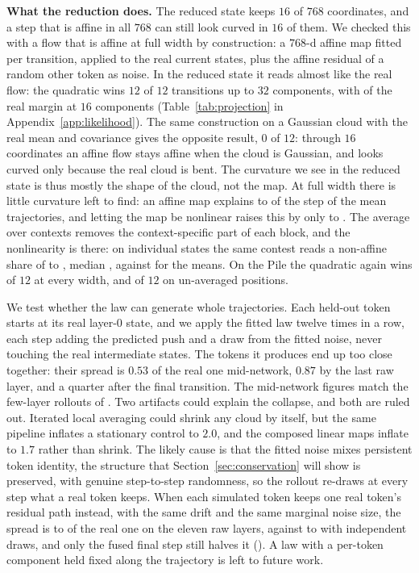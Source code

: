 \documentclass[mlmain]{jmlr}
\begin{document}
\textbf{What the reduction does.} The reduced state keeps $16$ of
$768$ coordinates, and a step that is affine in all $768$ can still look
curved in $16$ of them. We checked this with a flow that is affine at
full width by construction: a $768$-d affine map fitted per transition,
applied to the real current states, plus the affine residual of a random
other token as noise. In the reduced state it reads almost like the real
flow: the quadratic wins $12$ of $12$ transitions up to $32$ components,
with \crProjRatioSixteen{} of the real margin at $16$ components
(Table~\ref{tab:projection} in Appendix~\ref{app:likelihood}). The same
construction on a Gaussian cloud
with the real mean and covariance gives the opposite result, $0$ of
$12$: through $16$ coordinates an affine flow stays affine when the
cloud is Gaussian, and looks curved only because the real cloud is bent.
The curvature we see in the reduced state is thus mostly the shape of
the cloud, not the map. At full width there is little curvature left to
find: an affine map explains \crFullAffMin{} to \crFullAffMax{} of the
step of the mean trajectories, and letting the map be nonlinear raises
this by only \crFwGainMin{} to \crFwGainMax{}. The average over contexts
removes the context-specific part of each block, and the nonlinearity is
there: on \crOccFwPositions{} individual states the same contest reads a
non-affine share of \crOccFwShareMin{} to \crOccFwShareMax{}, median
\crOccFwShareMed{}, against \crFwShareMed{} for the means. On the Pile the quadratic again wins
\crPileQuadWinsMin{} of $12$ at every width, and \crOccQuadWins{} of
$12$ on \crOccPositions{} un-averaged positions.


We test whether the law can generate whole trajectories. Each held-out
token starts at its real layer-$0$ state, and we apply the fitted law
twelve times in a row, each step adding the predicted push and a draw
from the fitted noise, never touching the real intermediate states.
The tokens it produces end up too close together: their spread is
$0.53$ of the real one mid-network, $0.87$ by the last raw layer, and
a quarter after the final transition. The mid-network figures match the
few-layer rollouts of \citet{sarfati2024lines}. Two artifacts could
explain the collapse, and both are ruled out. Iterated local averaging
could shrink any cloud by itself, but the same pipeline inflates a
stationary control to $2.0$, and the composed linear maps inflate to
$1.7$ rather than shrink.
The likely cause is that the fitted noise mixes persistent token
identity, the structure that Section~\ref{sec:conservation} will show is
preserved, with genuine step-to-step randomness, so the rollout
re-draws at every step what a real token keeps. When each
simulated token keeps one real token's residual path instead, with the
same drift and the same marginal noise size, the spread is
\crIdPathMin{} to \crIdPathMax{} of the real one on the eleven raw
layers, against \crIidMin{} to \crIidMax{} with independent draws, and
only the fused final step still halves it (\crIdPathFused). A law with
a per-token component held fixed along the trajectory is left to future
work.
\end{document}
